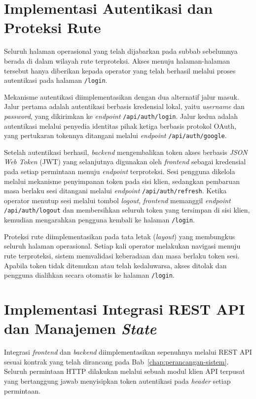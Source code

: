 \section{Implementasi Autentikasi dan Proteksi Rute}
Seluruh halaman operasional yang telah dijabarkan pada subbab sebelumnya berada di dalam wilayah rute terproteksi. 
Akses menuju halaman-halaman tersebut hanya diberikan kepada operator yang telah berhasil melalui proses autentikasi 
pada halaman \texttt{/login}.

Mekanisme autentikasi diimplementasikan dengan dua alternatif jalur masuk. Jalur pertama adalah autentikasi 
berbasis kredensial lokal, yaitu \textit{username} dan \textit{password}, yang dikirimkan ke \textit{endpoint} 
\texttt{/api/auth/login}. Jalur kedua adalah autentikasi melalui penyedia identitas pihak ketiga berbasis 
protokol OAuth, yang pertukaran tokennya ditangani melalui \textit{endpoint} \texttt{/api/auth/google}.

Setelah autentikasi berhasil, \textit{backend} mengembalikan token akses berbasis \textit{JSON Web Token} (JWT) 
yang selanjutnya digunakan oleh \textit{frontend} sebagai kredensial pada setiap permintaan menuju \textit{endpoint} 
terproteksi. Sesi pengguna dikelola melalui mekanisme penyimpanan token pada sisi klien, sedangkan pembaruan masa 
berlaku sesi ditangani melalui \textit{endpoint} \texttt{/api/auth/refresh}. Ketika operator menutup sesi melalui 
tombol \textit{logout}, \textit{frontend} memanggil \textit{endpoint} \texttt{/api/auth/logout} dan membersihkan 
seluruh token yang tersimpan di sisi klien, kemudian mengarahkan pengguna kembali ke halaman \texttt{/login}.

Proteksi rute diimplementasikan pada tata letak (\textit{layout}) yang membungkus seluruh halaman operasional. 
Setiap kali operator melakukan navigasi menuju rute terproteksi, sistem memvalidasi keberadaan dan masa berlaku 
token sesi. Apabila token tidak ditemukan atau telah kedaluwarsa, akses ditolak dan pengguna dialihkan secara 
otomatis ke halaman \texttt{/login}.

\section{Implementasi Integrasi REST API dan Manajemen \textit{State}}
Integrasi \textit{frontend} dan \textit{backend} diimplementasikan sepenuhnya melalui REST API sesuai 
kontrak yang telah dirancang pada Bab~\ref{chap:perancangan-sistem}. Seluruh permintaan HTTP dilakukan melalui 
sebuah modul klien API terpusat yang bertanggung jawab menyisipkan token autentikasi pada \textit{header} setiap 
permintaan.

